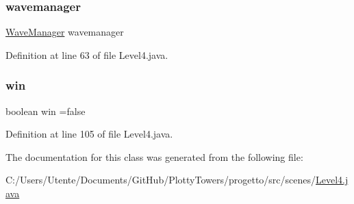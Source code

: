 \subsubsection{\texorpdfstring{wavemanager}{wavemanager}}
{\footnotesize\ttfamily \hyperlink{classmanagers_1_1_wave_manager}{Wave\+Manager} wavemanager\hspace{0.3cm}{\ttfamily [private]}}



Definition at line 63 of file Level4.\+java.

\mbox{\label{classscenes_1_1_level4_a1cc7b399bb950a160021766cd9a126f8}} 
\subsubsection{\texorpdfstring{win}{win}}
{\footnotesize\ttfamily boolean win =false\hspace{0.3cm}{\ttfamily [private]}}



Definition at line 105 of file Level4.\+java.



The documentation for this class was generated from the following file\+:\begin{DoxyCompactItemize}
\item 
C\+:/\+Users/\+Utente/\+Documents/\+Git\+Hub/\+Plotty\+Towers/progetto/src/scenes/\hyperlink{_level4_8java}{Level4.\+java}\end{DoxyCompactItemize}
